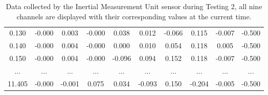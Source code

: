 \documentclass[]{article}
\begin{document}
\begin{table}[H]
\begin{center}
\begin{tabular}{cccccccccc}
				\footnotesize 0.130	& \footnotesize -0.000 & \footnotesize 0.003 & \footnotesize -0.000 & \footnotesize 0.038 & \footnotesize 0.012 & \footnotesize -0.066 & \footnotesize 0.115 & \footnotesize -0.007 & \footnotesize -0.500 \\
				
				\footnotesize 0.140	& \footnotesize -0.000 & \footnotesize 0.004 & \footnotesize -0.000 & \footnotesize 0.000 & \footnotesize 0.010 & \footnotesize 0.054 & \footnotesize 0.118 & \footnotesize 0.005 & \footnotesize -0.500 \\
				
				\footnotesize 0.150	& \footnotesize -0.000 & \footnotesize 0.004 & \footnotesize -0.000 & \footnotesize -0.096 & \footnotesize 0.094 & \footnotesize 0.152 & \footnotesize 0.118 & \footnotesize -0.007 & \footnotesize -0.500 \\
				
				\footnotesize ... & \footnotesize ... &\footnotesize ... & \footnotesize ... & \footnotesize ... & \footnotesize ... & \footnotesize ... & \footnotesize ... & \footnotesize ... & \footnotesize ... \\
				
				\footnotesize 11.405	& \footnotesize -0.000 & \footnotesize -0.001 & \footnotesize 0.075 & \footnotesize 0.034 & \footnotesize -0.093 & \footnotesize 0.150 & \footnotesize -0.204 & \footnotesize -0.005 & \footnotesize -0.500 \\
				
				
				
				
				
				\bottomrule\end{tabular}
			\caption{Data collected by the Inertial Measurement Unit sensor during Testing 2, all nine channels are displayed with their corresponding values at the current time.}
		\end{center}
	\end{table}
\end{document}
